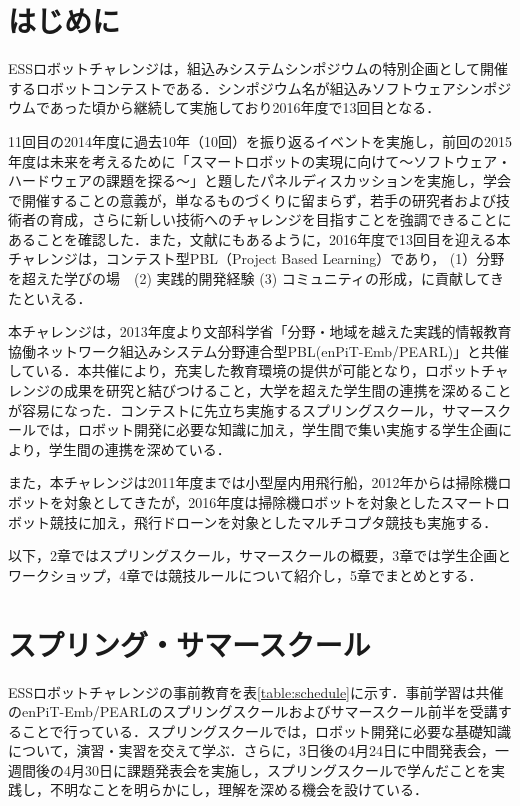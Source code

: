 \documentclass[submit]{ipsj}
\begin{document}
\maketitle

\section{はじめに}
ESSロボットチャレンジは，組込みシステムシンポジウムの特別企画として開催するロボットコンテストである．シンポジウム名が組込みソフトウェアシンポジウムであった頃から継続して実施しており2016年度で13回目となる．

11回目の2014年度に過去10年（10回）を振り返るイベントを実施し\cite{essrc2014}，前回の2015年度は未来を考えるために「スマートロボットの実現に向けて〜ソフトウェア・ハードウェアの課題を探る〜」と題したパネルディスカッションを実施し，学会で開催することの意義が，単なるものづくりに留まらず，若手の研究者および技術者の育成，さらに新しい技術へのチャレンジを目指すことを強調できることにあることを確認した\cite{essrc2015}．また，文献\cite{watanabe2016pbl}にもあるように，2016年度で13回目を迎える本チャレンジは，コンテスト型PBL（Project Based Learning）であり， (1）分野を超えた学びの場　(2) 実践的開発経験 (3) コミュニティの形成，に貢献してきたといえる．

本チャレンジは，2013年度より文部科学省「分野・地域を越えた実践的情報教育協働ネットワーク組込みシステム分野連合型PBL(enPiT-Emb/PEARL)」と共催している\cite{enpitweb}\cite{essrcweb}．本共催により，充実した教育環境の提供が可能となり，ロボットチャレンジの成果を研究と結びつけること，大学を超えた学生間の連携を深めることが容易になった．コンテストに先立ち実施するスプリングスクール，サマースクールでは，ロボット開発に必要な知識に加え，学生間で集い実施する学生企画により，学生間の連携を深めている．

また，本チャレンジは2011年度までは小型屋内用飛行船，2012年からは掃除機ロボットを対象としてきたが，2016年度は掃除機ロボットを対象としたスマートロボット競技に加え，飛行ドローンを対象としたマルチコプタ競技も実施する．

以下，2章ではスプリングスクール，サマースクールの概要，3章では学生企画とワークショップ，4章では競技ルールについて紹介し，5章でまとめとする．


\section{スプリング・サマースクール}

ESSロボットチャレンジの事前教育を表\ref{table:schedule}に示す．事前学習は共催のenPiT-Emb/PEARLのスプリングスクールおよびサマースクール前半を受講することで行っている．スプリングスクールでは，ロボット開発に必要な基礎知識について，演習・実習を交えて学ぶ．さらに，3日後の4月24日に中間発表会，一週間後の4月30日に課題発表会を実施し，スプリングスクールで学んだことを実践し，不明なことを明らかにし，理解を深める機会を設けている．
\end{document}
